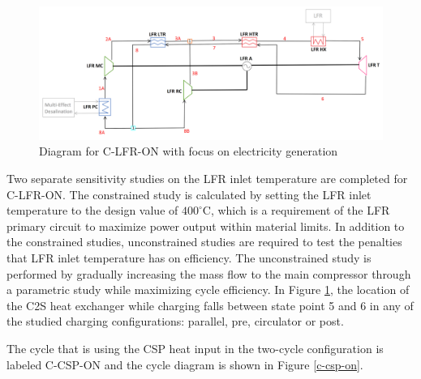 \begin{figure}[H] 
    \widefigure
    \includegraphics[width=\linewidth]{Definitions/c-lfr-on.pdf}
    \caption{Diagram for C-LFR-ON with focus on electricity generation\label{c-lfr-on}}
\end{figure}

Two separate sensitivity studies on the LFR inlet temperature are completed for C-LFR-ON. The constrained study is calculated by setting the LFR inlet temperature to the design value of $400^{\circ}$C, which is a requirement of the LFR primary circuit to maximize power output within material limits. In addition to the constrained studies, unconstrained studies are required to test the penalties that LFR inlet temperature has on efficiency. The unconstrained study is performed by gradually increasing the mass flow to the main compressor through a parametric study while maximizing cycle efficiency. In Figure \ref{c-lfr-on}, the location of the C2S heat exchanger while charging falls between state point 5 and 6 in any of the studied charging configurations: parallel, pre, circulator or post. 

The cycle that is using the CSP heat input in the two-cycle configuration is labeled C-CSP-ON and the cycle diagram is shown in Figure \ref{c-csp-on}. 

